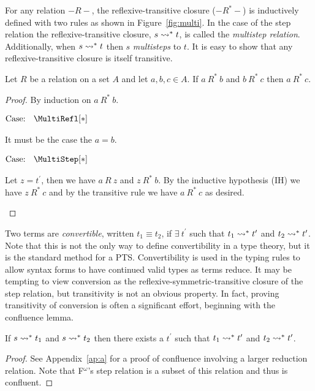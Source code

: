 

For any relation $-R-$, the reflexive-transitive closure ($-R^*-$) is inductively defined with two rules as shown in Figure~\ref{fig:multi}.
In the case of the step relation the reflexive-transitive closure, $s \rightsquigarrow^* t$, is called the \textit{multistep relation}.
Additionally, when $s \rightsquigarrow^* t$ then $s$ \textit{multisteps} to $t$.
It is easy to show that any reflexive-transitive closure is itself transitive.

\begin{lemma}
    Let $R$ be a relation on a set $A$ and let $a, b, c \in A$. If $a\ R^*\ b$ and $b\ R^*\ c$ then $a\ R^*\ c$.
\end{lemma}
\begin{proof}
    By induction on $a\ R^*\ b$.

    $\text{Case: }\begin{array}{c} \MultiRefl[*] \end{array}$
    \begin{proofcase}
        It must be the case the $a = b$.
    \end{proofcase}

    $\text{Case: }\begin{array}{c} \MultiStep[*] \end{array}$
    \begin{proofcase}
        Let $z = t^\prime$, then we have $a\ R\ z$ and $z\ R^*\ b$.
        By the inductive hypothesis (IH) we have $z\ R^*\ c$ and by the transitive rule we have $a\ R^*\ c$ as desired.
    \end{proofcase}
\end{proof}

Two terms are \textit{convertible}, written $t_1 \equiv t_2$, if $\exists\ t^\prime$ such that $t_1 \rightsquigarrow^* t^\prime$ and $t_2 \rightsquigarrow^* t^\prime$.
Note that this is not the only way to define convertibility in a type theory, but it is the standard method for a PTS.
Convertibility is used in the typing rules to allow syntax forms to have continued valid types as terms reduce.
It may be tempting to view conversion as the reflexive-symmetric-transitive closure of the step relation, but transitivity is not an obvious property.
In fact, proving transitivity of conversion is often a significant effort, beginning with the confluence lemma.

\begin{lemma}[Confluence]
    If $s \rightsquigarrow^* t_1$ and $s \rightsquigarrow^* t_2$ then there exists a $t^\prime$ such that $t_1 \rightsquigarrow^* t^\prime$ and $t_2 \rightsquigarrow^* t^\prime$.
\end{lemma}
\begin{proof}
    See Appendix~\ref{ap:a} for a proof of confluence involving a larger reduction relation. Note that F$^\omega$'s step relation is a subset of this relation and thus is confluent.
\end{proof}

